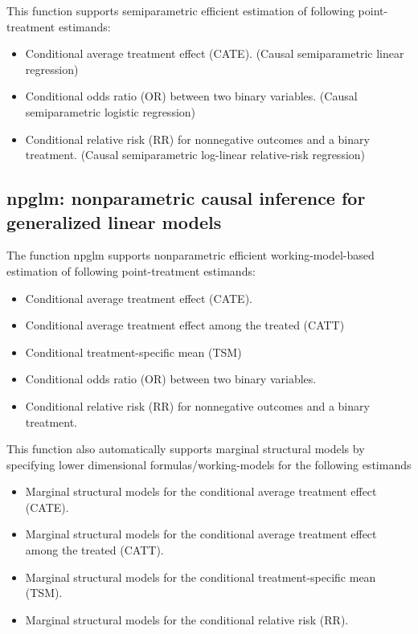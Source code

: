 \documentclass[article]{jss}
\begin{document}
This function supports semiparametric efficient estimation of following point-treatment estimands:

\begin{itemize}
\item Conditional average treatment effect (CATE). (Causal semiparametric linear regression)
\item Conditional odds ratio (OR) between two binary variables. (Causal semiparametric logistic regression)
\item Conditional relative risk (RR) for nonnegative outcomes and a binary treatment. (Causal semiparametric log-linear relative-risk regression)

\end{itemize}



\subsection{npglm: nonparametric causal inference for generalized linear models}

The function npglm supports nonparametric efficient working-model-based estimation of following point-treatment estimands:

\begin{itemize}
\item Conditional average treatment effect (CATE).
\item Conditional average treatment effect among the treated (CATT)
\item Conditional treatment-specific mean (TSM)
\item Conditional odds ratio (OR) between two binary variables. 
\item Conditional relative risk (RR) for nonnegative outcomes and a binary treatment.  
\end{itemize}

This function also automatically supports marginal structural models by specifying lower dimensional formulas/working-models for the following estimands
\begin{itemize}
\item Marginal structural models for the conditional average treatment effect (CATE).
\item Marginal structural models for the conditional average treatment effect among the treated (CATT).
\item Marginal structural models for the conditional treatment-specific mean (TSM).
\item Marginal structural models for the conditional relative risk (RR). 
\end{itemize}
\end{document}
